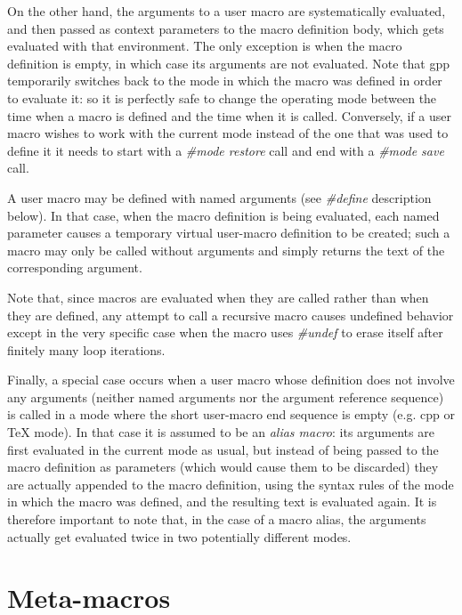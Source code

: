 On the other hand, the arguments to a user macro are systematically
evaluated, and then passed as context parameters to the macro definition 
body, which gets evaluated with that environment. The only exception is
when the macro definition is empty, in which case its arguments are not
evaluated. Note that gpp temporarily switches back to the mode in which
the macro was defined in order to evaluate it: so it is perfectly safe
to change the operating mode between the time when a macro is defined
and the time when it is called. Conversely, if a user macro wishes to
work with the current mode instead of the one that was used to define it
it needs to start with a {\it \#mode restore} call and end with a 
{\it \#mode save} call.


A user macro may be defined with named arguments (see {\it \#define}
description below). In that case, when the macro definition is being
evaluated, each named parameter causes a temporary virtual user-macro
definition to be created; such a macro may only be called without arguments
and simply returns the text of the corresponding argument.


Note that, since macros are evaluated when they are called rather than
when they are defined, any attempt to call a recursive macro causes
undefined behavior except in the very specific case when the macro
uses {\it \#undef} to erase itself after finitely many loop iterations.


Finally, a special case occurs when a user macro whose definition does not
involve any arguments (neither named arguments nor the argument reference
sequence) is called in a mode where the short user-macro end sequence is
empty (e.g. cpp or TeX mode). In that case it is assumed to be an 
{\it alias macro}: its arguments are first evaluated in the current mode
as usual, but instead of being passed to the macro definition as parameters
(which would cause them to be discarded) they are actually appended to the
macro definition, using the syntax rules of the mode in which the macro was
defined, and the resulting text is evaluated again. It is therefore
important to note that, in the case of a macro alias, the arguments
actually get evaluated twice in two potentially different modes.
\section{Meta-macros}



